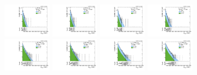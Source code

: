 \begin{figure}[htbp]
  \centering
  \includegraphics[width=0.18\textwidth]{fig/fitValidation/PostFit_SR_MVV_MJJ070to110__mu_HP_bb_LDy_Run2.pdf}
  \includegraphics[width=0.18\textwidth]{fig/fitValidation/PostFit_SR_MVV_MJJ070to110__e_HP_bb_LDy_Run2.pdf}
  \includegraphics[width=0.18\textwidth]{fig/fitValidation/PostFit_SR_MVV_MJJ070to110__mu_LP_bb_LDy_Run2.pdf}
  \includegraphics[width=0.18\textwidth]{fig/fitValidation/PostFit_SR_MVV_MJJ070to110__e_LP_bb_LDy_Run2.pdf}\\
  \includegraphics[width=0.18\textwidth]{fig/fitValidation/PostFit_SR_MVV_MJJ070to110__mu_HP_nobb_LDy_Run2.pdf}
  \includegraphics[width=0.18\textwidth]{fig/fitValidation/PostFit_SR_MVV_MJJ070to110__e_HP_nobb_LDy_Run2.pdf}
  \includegraphics[width=0.18\textwidth]{fig/fitValidation/PostFit_SR_MVV_MJJ070to110__mu_LP_nobb_LDy_Run2.pdf}
  \includegraphics[width=0.18\textwidth]{fig/fitValidation/PostFit_SR_MVV_MJJ070to110__e_LP_nobb_LDy_Run2.pdf}\\

\end{figure}
